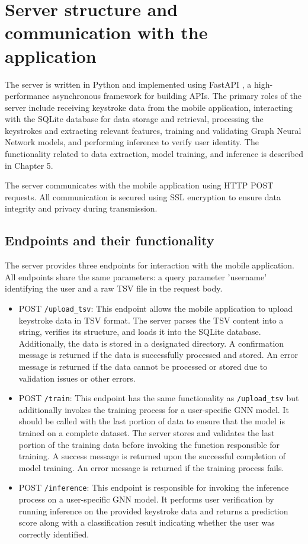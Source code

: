 \section{Server structure and communication with the application}
The server is written in Python and implemented using FastAPI \cite{fastapi}, a high-performance asynchronous framework for building APIs. The primary roles of the server include receiving keystroke data from the mobile application, interacting with the SQLite database for data storage and retrieval, processing the keystrokes and extracting relevant features, training and validating Graph Neural Network models, and performing inference to verify user identity. The functionality related to data extraction, model training, and inference is described in Chapter 5.

The server communicates with the mobile application using HTTP POST requests. All communication is secured using SSL encryption to ensure data integrity and privacy during transmission.

\subsection{Endpoints and their functionality}
The server provides three endpoints for interaction with the mobile application. All endpoints share the same parameters: a query parameter 'username' identifying the user and a raw TSV file in the request body.
\begin{itemize}
    \item POST \texttt{/upload\_tsv}: This endpoint allows the mobile application to upload keystroke data in TSV format. The server parses the TSV content into a string, verifies its structure, and loads it into the SQLite database. Additionally, the data is stored in a designated directory. A confirmation message is returned if the data is successfully processed and stored. An error message is returned if the data cannot be processed or stored due to validation issues or other errors.
    \item POST \texttt{/train}: This endpoint has the same functionality as \texttt{/upload\_tsv} but additionally invokes the training process for a user-specific GNN model. It should be called with the last portion of data to ensure that the model is trained on a complete dataset. The server stores and validates the last portion of the training data before invoking the function responsible for training. A success message is returned upon the successful completion of model training. An error message is returned if the training process fails.
    \item POST \texttt{/inference}: This endpoint is responsible for invoking the inference process on a user-specific GNN model. It performs user verification by running inference on the provided keystroke data and returns a prediction score along with a classification result indicating whether the user was correctly identified.
\end{itemize}

